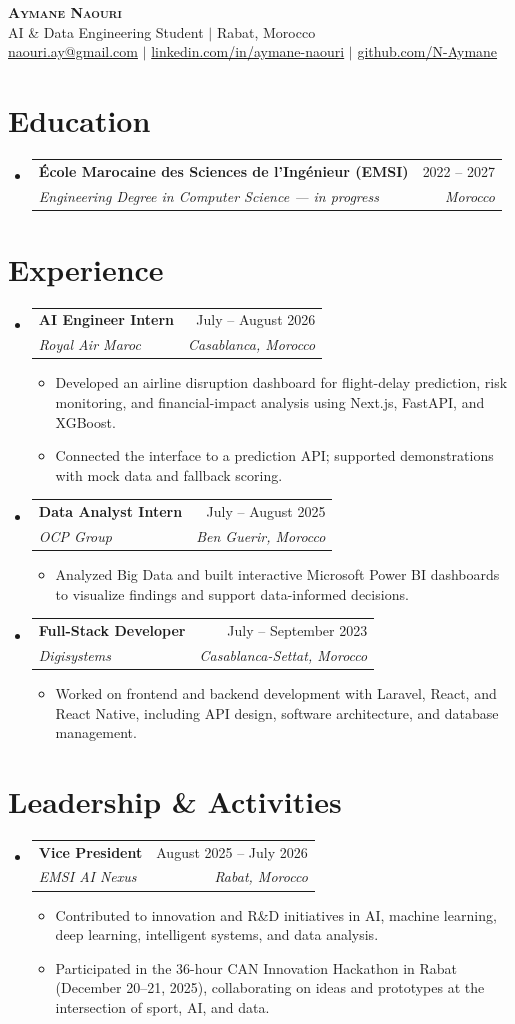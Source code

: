 \documentclass[letterpaper,11pt]{article}
\makeatletter
\newcommand{\resumeItem}[1]{\item\small{#1}}
\newcommand{\resumeSubheading}[4]{
  \item\begin{tabular*}{0.97\textwidth}[t]{l@{\extracolsep{\fill}}r}
    \textbf{#1} & #2 \\
    \textit{\small#3} & \textit{\small#4} \\
  \end{tabular*}\vspace{-6pt}}
\newcommand{\resumeSubHeadingListStart}{\begin{itemize}[leftmargin=0.15in,label={},itemsep=5pt,topsep=3pt]}
\newcommand{\resumeSubHeadingListEnd}{\end{itemize}\vspace{-5pt}}
\newcommand{\resumeItemListStart}{\begin{itemize}[leftmargin=0.2in,itemsep=1pt,topsep=5pt]}
\newcommand{\resumeItemListEnd}{\end{itemize}\vspace{-5pt}}
\makeatother
\begin{document}
\begin{center}
  \textbf{\Huge\scshape Aymane Naouri} \\ \vspace{3pt}
  \small AI \& Data Engineering Student $|$ Rabat, Morocco \\ \vspace{2pt}
  \href{mailto:naouri.ay@gmail.com}{naouri.ay@gmail.com} $|$
  \href{https://www.linkedin.com/in/aymane-naouri}{linkedin.com/in/aymane-naouri} $|$
  \href{https://github.com/N-Aymane}{github.com/N-Aymane}
\end{center}

\section{Education}
\resumeSubHeadingListStart
  \resumeSubheading
    {\'Ecole Marocaine des Sciences de l'Ing\'enieur (EMSI)}{2022 -- 2027}
    {Engineering Degree in Computer Science --- in progress}{Morocco}
\resumeSubHeadingListEnd

\section{Experience}
\resumeSubHeadingListStart
  \resumeSubheading{AI Engineer Intern}{July -- August 2026}{Royal Air Maroc}{Casablanca, Morocco}
  \resumeItemListStart
    \resumeItem{Developed an airline disruption dashboard for flight-delay prediction, risk monitoring, and financial-impact analysis using Next.js, FastAPI, and XGBoost.}
    \resumeItem{Connected the interface to a prediction API; supported demonstrations with mock data and fallback scoring.}
  \resumeItemListEnd
  \resumeSubheading{Data Analyst Intern}{July -- August 2025}{OCP Group}{Ben Guerir, Morocco}
  \resumeItemListStart
    \resumeItem{Analyzed Big Data and built interactive Microsoft Power BI dashboards to visualize findings and support data-informed decisions.}
  \resumeItemListEnd
  \resumeSubheading{Full-Stack Developer}{July -- September 2023}{Digisystems}{Casablanca-Settat, Morocco}
  \resumeItemListStart
    \resumeItem{Worked on frontend and backend development with Laravel, React, and React Native, including API design, software architecture, and database management.}
  \resumeItemListEnd
\resumeSubHeadingListEnd

\section{Leadership \& Activities}
\resumeSubHeadingListStart
  \resumeSubheading{Vice President}{August 2025 -- July 2026}{EMSI AI Nexus}{Rabat, Morocco}
  \resumeItemListStart
    \resumeItem{Contributed to innovation and R\&D initiatives in AI, machine learning, deep learning, intelligent systems, and data analysis.}
    \resumeItem{Participated in the 36-hour CAN Innovation Hackathon in Rabat (December 20--21, 2025), collaborating on ideas and prototypes at the intersection of sport, AI, and data.}
  \resumeItemListEnd
\resumeSubHeadingListEnd
\end{document}
